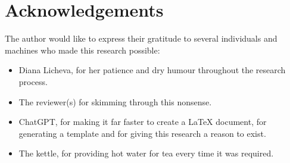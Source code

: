 \documentclass[12pt]{article}
\begin{document}
\section*{Acknowledgements}
The author would like to express their gratitude to several individuals and machines who made this research possible:

\begin{itemize}
    \item Diana Licheva, for her patience and dry humour throughout the research process.
    \item The reviewer(s) for skimming through this nonsense.
    \item ChatGPT, for making it far faster to create a LaTeX document, for generating a template and for giving this research a reason to exist.
    \item The kettle, for providing hot water for tea every time it was required.
    
\end{itemize}

\begin{sloppypar} %
\printbibliography 
\end{sloppypar}
\end{document}
